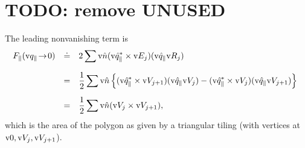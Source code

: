 \section{TODO: remove UNUSED}

The leading nonvanishing term is
\begin{equation}
  \begin{array}{@{}lcl}
  F_\parallel(\qp\!\to\!0)
    &\doteq& \displaystyle 2\sum \n(\uqp^*\times\E_j) (\uqp\R_j)\\[3ex]
    &=&\displaystyle \frac{1}{2}\sum \n\left\{
        (\uqp^*\times\V_{j+1})(\uqp\V_j)
      - (\uqp^*\times\V_j)(\uqp\V_{j+1})
      \right\}\\[3ex]
    &=&\displaystyle \frac{1}{2}\sum \n(\V_j\times\V_{j+1}),
  \end{array}
\end{equation}
which is the area of the polygon
as given by a triangular tiling (with vertices at $\text{v}{0},\text{v}{V}_j,\text{v}{V}_{j+1}$).


